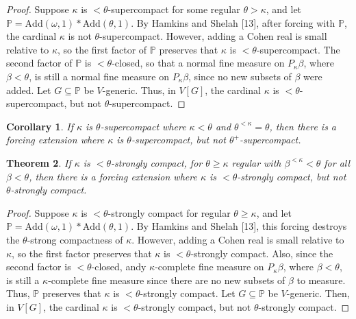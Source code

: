 \documentclass[10pt,leqno]{amsart}
\newtheorem{theorem}{Theorem}[]
\newtheorem{corollary}[theorem]{Corollary}
\begin{document}
\begin{proof} Suppose $\kappa$ is $<\theta$-supercompact for some regular $\theta > \kappa$, and let $\mathbb{P} = \mbox{Add}(\omega, 1)*\mbox{Add}(\theta,1)$. By Hamkins and Shelah [13], after forcing with $\mathbb{P}$, the cardinal $\kappa$ is not $\theta$-supercompact. However, adding a Cohen real is small relative to $\kappa$, so the first factor of $\mathbb{P}$ preserves that $\kappa$ is $<\theta$-supercompact. The second factor of $\mathbb{P}$ is $<\theta$-closed, so that a normal fine measure on $P_{\kappa} \beta$, where $\beta < \theta$, is still a normal fine measure on $P_{\kappa} \beta$, since no new subsets of $\beta$ were added. Let $G \subseteq \mathbb{P}$ be $V$-generic. Thus, in $V[G]$, the cardinal $\kappa$ is $<\theta$-supercompact, but not $\theta$-supercompact. 
\end{proof}

\begin{corollary} If $\kappa$ is $\theta$-supercompact where $\kappa < \theta$ and $\theta^{<\kappa} = \theta$, then there is a forcing extension where $\kappa$ is $\theta$-supercompact, but not $\theta^+$-supercompact.
\end{corollary}

\begin{theorem} If $\kappa$ is $<\theta$-strongly compact, for $\theta \ge \kappa$ regular with $\beta^{<\kappa} < \theta$ for all $\beta < \theta$, then there is a forcing extension where $\kappa$ is $<\theta$-strongly compact, but not $\theta$-strongly compact. 
\end{theorem}

\begin{proof} Suppose $\kappa$ is $<\theta$-strongly compact for regular $\theta \ge \kappa$, and let $\mathbb{P} = \mbox{Add}(\omega,1)*\mbox{Add}(\theta,1)$. By Hamkins and Shelah [13], this forcing destroys the $\theta$-strong compactness of $\kappa$. However, adding a Cohen real is small relative to $\kappa$, so the first factor preserves that $\kappa$ is $<\theta$-strongly compact. Also, since the second factor is $<\theta$-closed, andy $\kappa$-complete fine measure on $P_{\kappa}\beta$, where $\beta < \theta$, is still a $\kappa$-complete fine measure since there are no new subsets of $\beta$ to measure. Thus, $\mathbb{P}$ preserves that $\kappa$ is $<\theta$-strongly compact. Let $G \subseteq \mathbb{P}$ be $V$-generic. Then, in $V[G]$, the cardinal $\kappa$ is $<\theta$-strongly compact, but not $\theta$-strongly compact.
\end{proof}
\end{document}
